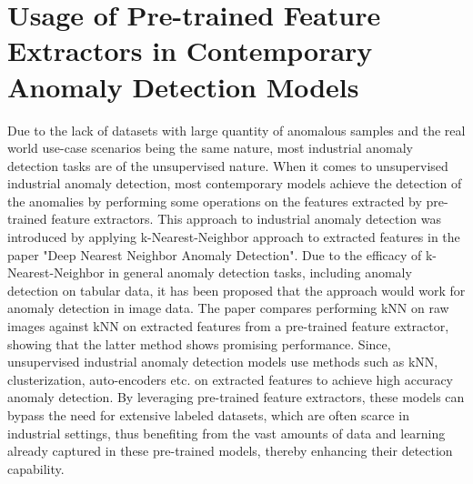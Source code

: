 \section{Usage of Pre-trained Feature Extractors in Contemporary Anomaly Detection Models}
\label{feature extractors}
Due to the lack of datasets with large quantity of anomalous samples and the real world use-case scenarios being the same nature, most industrial anomaly detection tasks are of the unsupervised nature. When it comes to unsupervised industrial anomaly detection, most contemporary models achieve the detection of the anomalies by performing some operations on the features extracted by pre-trained feature extractors. This approach to industrial anomaly detection was introduced by applying k-Nearest-Neighbor approach to extracted features in the paper "Deep Nearest Neighbor Anomaly Detection". Due to the efficacy of k-Nearest-Neighbor in general anomaly detection tasks, including anomaly detection on tabular data, it has been proposed that the approach would work for anomaly detection in image data. The paper compares performing kNN on raw images against kNN on extracted features from a pre-trained feature extractor, showing that the latter method shows promising performance. Since, unsupervised industrial anomaly detection models use methods such as kNN, clusterization, auto-encoders etc. on extracted features to achieve high accuracy anomaly detection. By leveraging pre-trained feature extractors, these models can bypass the need for extensive labeled datasets, which are often scarce in industrial settings, thus benefiting from the vast amounts of data and learning already captured in these pre-trained models, thereby enhancing their detection capability.

